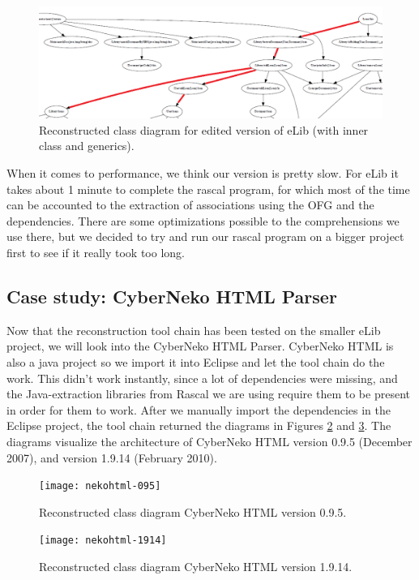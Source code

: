 \documentclass[a4paper,11pt]{article}
\begin{document}
			\begin{figure}[h!]
				\centering
				\includegraphics[angle=90,height=0.98\textheight]{loans}
				\caption{Reconstructed class diagram for edited version of eLib (with inner class and generics).}
				\label{fig:loans}
			\end{figure}

			When it comes to performance, we think our version is pretty slow. For eLib it takes about 1 minute to complete the rascal program, for which most of the time can be accounted to the extraction of associations using the OFG and the dependencies. There are some optimizations possible to the comprehensions we use there, but we decided to try and run our rascal program on a bigger project first to see if it really took too long.
			
		\subsection{Case study: CyberNeko HTML Parser}
			Now that the reconstruction tool chain has been tested on the smaller eLib project, we will look into the CyberNeko HTML Parser. CyberNeko HTML is also a java project so we import it into Eclipse and let the tool chain do the work. This didn't work instantly, since a lot of dependencies were missing, and the Java-extraction libraries from Rascal we are using require them to be present in order for them to work. After we manually import the dependencies in the Eclipse project, the tool chain returned the diagrams in Figures \ref{fig:neko1} and \ref{fig:neko2}. The diagrams visualize the architecture of CyberNeko HTML version 0.9.5 (December 2007), and version 1.9.14 (February 2010). \\

			\begin{figure}[h!]
				\centering
				\texttt{[image: nekohtml-095]}
				\caption{Reconstructed class diagram CyberNeko HTML version 0.9.5.}
				\label{fig:neko1}
			\end{figure}
			
			\begin{figure}[h!]
				\centering
				\texttt{[image: nekohtml-1914]}
				\caption{Reconstructed class diagram CyberNeko HTML version 1.9.14.}
				\label{fig:neko2}
			\end{figure}
\end{document}
